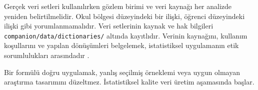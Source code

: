 Gerçek veri setleri kullanılırken gözlem birimi ve veri kaynağı her analizde
yeniden belirtilmelidir. Okul bölgesi düzeyindeki bir ilişki, öğrenci
düzeyindeki ilişki gibi yorumlanmamalıdır. Veri setlerinin kaynak ve hak
bilgileri \texttt{companion/data/dictionaries/} altında kayıtlıdır.
Verinin kaynağını, kullanım koşullarını ve yapılan dönüşümleri belgelemek,
istatistiksel uygulamanın etik sorumlulukları arasındadır
\citep{asaethics2022}.

\begin{mistakebox}
Bir formülü doğru uygulamak, yanlış seçilmiş örneklemi veya uygun olmayan
araştırma tasarımını düzeltmez. İstatistiksel kalite veri üretim aşamasında
başlar.
\end{mistakebox}